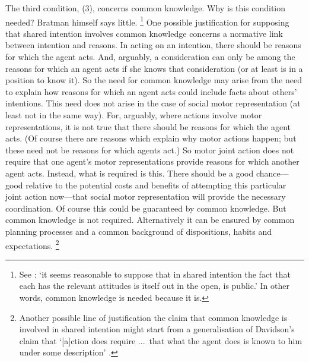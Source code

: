 \documentclass[12pt,\papersize]{extarticle}
\begin{document}
The third condition, (3), concerns common knowledge.
Why is this condition needed?
Bratman himself says little.%
\footnote{
See \citet[p.\ 117]{Bratman:1993je}:
`it seems reasonable to suppose that in shared intention the fact that each has the relevant attitudes is itself out in the open, is public.' 
In other words, common knowledge is needed because it is.
}
One possible justification for supposing that shared intention involves common knowledge concerns a normative link between intention and reasons.
In acting on an intention, there should be reasons for which the  agent acts.
And, arguably, a consideration can only be among the reasons for which an agent acts if she knows that consideration (or at least is in a position to know it).
So the need for common knowledge may arise from the need to explain how reasons for which an agent acts could include facts about others' intentions.
This need does not arise in the case of social motor representation (at least not in the same way).
For, arguably, where actions involve motor representations, it is not true that there should be reasons for which the agent acts.
(Of course there are reasons which explain why motor actions happen; but these need not be reasons for which agents act.)
So motor joint action does not require that one agent's motor representations provide reasons for which another agent acts.
Instead, what is required is this.
There should be a good chance---good relative to the potential costs and benefits of attempting this particular joint action now---that social motor representation will provide the necessary coordination.
Of course this could be guaranteed by common knowledge. 
But common knowledge is not required.
Alternatively it can be ensured by common planning processes and a common {background} of dispositions, habits and expectations.%
\footnote{
Another possible line of justification the claim that common knowledge is involved in shared intention might start from a generalisation of Davidson's claim that
`[a]ction does require %
...\ that what the agent does is known to him under some description' \citep[p.\ 50]{Davidson:1971fz}.
} 
\end{document}
